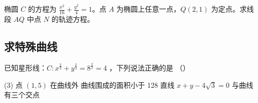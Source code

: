\begin{example}
    椭圆 $C$ 的方程为 $\frac{x^2}{16} + \frac{y^2}{4} = 1$。点 $A$ 为椭圆上任意一点，$Q(2, 1)$ 为定点。求线段 $AQ$ 中点 $N$ 的轨迹方程。
\end{example}

\vspace{8em}

\subsection{求特殊曲线}

\begin{example}
    已知星形线：$C: x^{\frac{2}{3}}+y^{\frac{2}{3}}=8^{\frac{2}{3}}=4$ ，下列说法正确的是 （\qquad）
    \begin{tasks}(3)
        \task 点 $(1,5)$ 在曲线外
        \task 曲线围成的面积小于 128
        \task 直线 $x+y-4 \sqrt{3}=0$ 与曲线有三个交点
    \end{tasks}

    \begin{figure} [H]
        \centering
        \resizebox{0.2\textwidth}{!}{}
    \end{figure}
\end{example}


